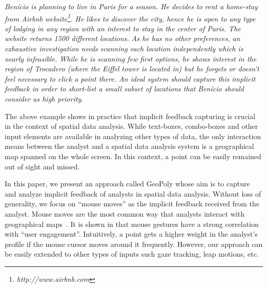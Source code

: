 \vspace{2pt}
 {\em Ben\'icio is planning to live in Paris for a season. He decides to rent a home-stay from Airbnb website\footnote{\it http://www.airbnb.com}. He likes to discover the city, hence he is open to any type of lodging in any region with an interest to stay in the center of Paris. The website returns 1500 different locations. As he has no other preferences, an exhaustive investigation needs scanning each location independently which is nearly infeasible. While he is scanning few first options, he shows interest in the region of Trocadero (where the Eiffel tower is located in) but he forgets or doesn't feel necessary to click a point there. An ideal system should capture this implicit feedback in order to short-list a small subset of locations that Ben\'icio should consider as high priority}.

\vspace{2pt}
The above example shows in practice that implicit feedback capturing is crucial in the context of spatial data analysis. While text-boxes, combo-boxes and other input elements are available in analyzing other types of data, the only interaction means between the analyst and a spatial data analysis system is a geographical map spanned on the whole screen. In this context, a point can be easily remained out of sight and missed.

\vspace{2pt}
In this paper, we present an approach called {\sc GeoPoly} whose aim is to capture and analyze implicit feedback of analysts in spatial data analysis. Without loss of generality, we focus on ``mouse moves'' as the implicit feedback received from the analyst. Mouse moves are the most common way that analysts interact with geographical maps~\cite{Chen:2001}. It is shown in \cite{Arapakis:2014} that mouse gestures have a strong correlation with ``user engagement''. Intuitively, a point gets a higher weight in the analyst's profile if the mouse cursor moves around it frequently.  However, our approach can be easily extended to other types of inputs such gaze tracking, leap motions, etc.


